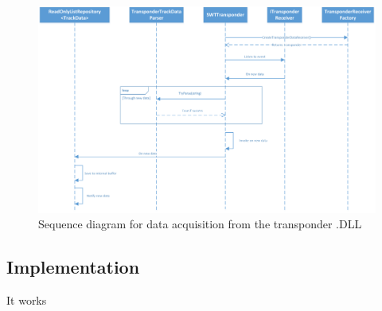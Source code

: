 \begin{figure}
	\centering
	\includegraphics[width=1.0\linewidth]{Images/SWTTransponder}
	\caption{Sequence diagram for data acquisition from the transponder .DLL}
	\label{fig:SWTTransponderSeq}
\end{figure}

\subsection{Implementation}

It works



\clearpage
